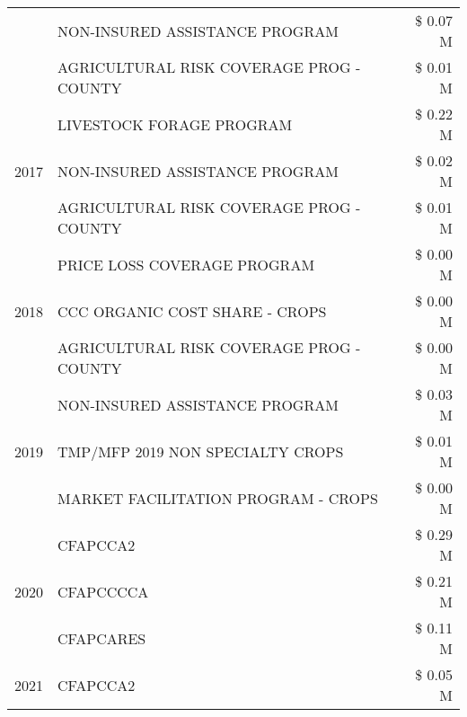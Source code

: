 \begin{tabular}{llr}
 & NON-INSURED ASSISTANCE PROGRAM                & \$ 0.07 M \\
 & AGRICULTURAL RISK COVERAGE PROG - COUNTY      & \$ 0.01 M \\
\cline{1-3}
\multirow[t]{3}{*}{2017} & LIVESTOCK FORAGE PROGRAM & \$ 0.22 M \\
 & NON-INSURED ASSISTANCE PROGRAM & \$ 0.02 M \\
 & AGRICULTURAL RISK COVERAGE PROG - COUNTY & \$ 0.01 M \\
\cline{1-3}
\multirow[t]{3}{*}{2018} & PRICE LOSS COVERAGE PROGRAM & \$ 0.00 M \\
 & CCC ORGANIC COST SHARE - CROPS & \$ 0.00 M \\
 & AGRICULTURAL RISK COVERAGE PROG - COUNTY & \$ 0.00 M \\
\cline{1-3}
\multirow[t]{3}{*}{2019} & NON-INSURED ASSISTANCE PROGRAM & \$ 0.03 M \\
 & TMP/MFP 2019 NON SPECIALTY CROPS & \$ 0.01 M \\
 & MARKET FACILITATION PROGRAM - CROPS & \$ 0.00 M \\
\cline{1-3}
\multirow[t]{3}{*}{2020} & CFAPCCA2 & \$ 0.29 M \\
 & CFAPCCCCA & \$ 0.21 M \\
 & CFAPCARES & \$ 0.11 M \\
\cline{1-3}
2021 & CFAPCCA2 & \$ 0.05 M \\
\cline{1-3}
\bottomrule
\end{tabular}
